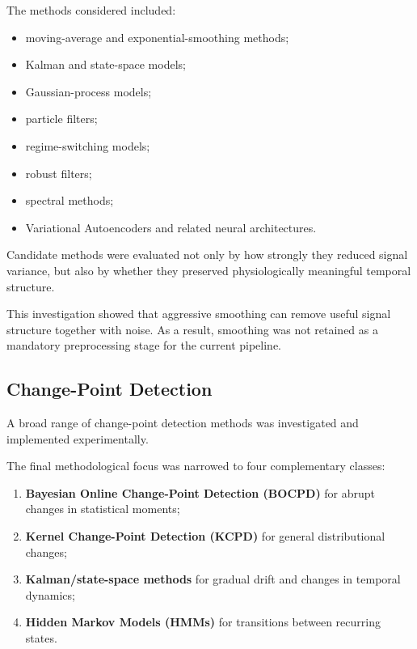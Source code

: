 \documentclass[11pt,a4paper]{article}
\begin{document}
The methods considered included:

\begin{itemize}[leftmargin=1.5em]
    \item moving-average and exponential-smoothing methods;
    \item Kalman and state-space models;
    \item Gaussian-process models;
    \item particle filters;
    \item regime-switching models;
    \item robust filters;
    \item spectral methods;
    \item Variational Autoencoders and related neural architectures.
\end{itemize}

Candidate methods were evaluated not only by how strongly they reduced signal
variance, but also by whether they preserved physiologically meaningful
temporal structure.

This investigation showed that aggressive smoothing can remove useful signal
structure together with noise. As a result, smoothing was not retained as a
mandatory preprocessing stage for the current pipeline.

\subsection{Change-Point Detection}

A broad range of change-point detection methods was investigated and
implemented experimentally.

The final methodological focus was narrowed to four complementary classes:

\begin{enumerate}[leftmargin=1.7em]

    \item \textbf{Bayesian Online Change-Point Detection (BOCPD)} for abrupt
    changes in statistical moments;

    \item \textbf{Kernel Change-Point Detection (KCPD)} for general
    distributional changes;

    \item \textbf{Kalman/state-space methods} for gradual drift and changes in
    temporal dynamics;

    \item \textbf{Hidden Markov Models (HMMs)} for transitions between
    recurring states.

\end{enumerate}
\end{document}
